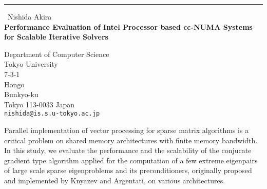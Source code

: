\documentclass{report}
\begin{document}
\begin{center}
\rule{6in}{1pt} \
{\large Nishida Akira \\
{\bf Performance Evaluation of Intel Processor based cc-NUMA Systems for Scalable Iterative Solvers}}

Department of Computer Science \\ Tokyo University \\ 7-3-1 \\ Hongo \\ Bunkyo-ku \\ Tokyo 113-0033 Japan
\\
{\tt nishida@is.s.u-tokyo.ac.jp}\end{center}

Parallel implementation of vector processing for sparse matrix
algorithms is a critical problem on shared memory architectures
with finite memory bandwidth.
In this study, we evaluate the performance and the scalability of the
conjucate gradient type algorithm applied for the computation of a
few extreme eigenpairs of large scale sparse eigenproblems and its
preconditioners, originally
proposed and implemented by Knyazev and Argentati, on various architectures.
\end{document}
